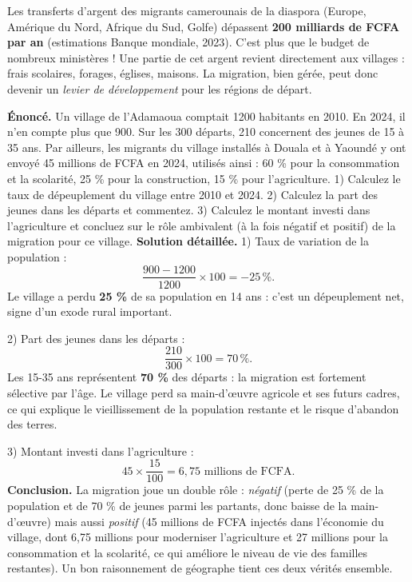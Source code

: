 \documentclass[11pt]{article}
\newcommand{\cle}[1]{{\popxbold\color{popdark}#1}}
\begin{document}
\begin{savaistu}
Les transferts d'argent des migrants camerounais de la diaspora (Europe, Amérique du Nord, Afrique du Sud, Golfe) dépassent \textbf{200 milliards de FCFA par an} (estimations Banque mondiale, 2023). C'est plus que le budget de nombreux ministères ! Une partie de cet argent revient directement aux villages : frais scolaires, forages, églises, maisons. La migration, bien gérée, peut donc devenir un \emph{levier de développement} pour les régions de départ.
\end{savaistu}

\begin{exoresolu}
\textbf{Énoncé.} Un village de l'Adamaoua comptait \num{1200} habitants en 2010. En 2024, il n'en compte plus que 900. Sur les 300 départs, 210 concernent des jeunes de 15 à 35 ans. Par ailleurs, les migrants du village installés à Douala et à Yaoundé y ont envoyé 45 millions de FCFA en 2024, utilisés ainsi : 60 \% pour la consommation et la scolarité, 25 \% pour la construction, 15 \% pour l'agriculture.
1) Calculez le taux de dépeuplement du village entre 2010 et 2024.
2) Calculez la part des jeunes dans les départs et commentez.
3) Calculez le montant investi dans l'agriculture et concluez sur le rôle ambivalent (à la fois négatif et positif) de la migration pour ce village.
\tcblower
\textbf{Solution détaillée.}
1) Taux de variation de la population :
\[ \frac{900-1200}{1200}\times 100 = -25\,\%. \]
Le village a perdu \textbf{25 \%} de sa population en 14 ans : c'est un dépeuplement net, signe d'un exode rural important.

2) Part des jeunes dans les départs :
\[ \frac{210}{300}\times 100 = 70\,\%. \]
Les 15-35 ans représentent \textbf{70 \%} des départs : la migration est fortement \cle{sélective} par l'âge. Le village perd sa main-d'œuvre agricole et ses futurs cadres, ce qui explique le vieillissement de la population restante et le risque d'abandon des terres.

3) Montant investi dans l'agriculture :
\[ 45 \times \frac{15}{100} = 6,75 \text{ millions de FCFA}. \]
\textbf{Conclusion.} La migration joue un double rôle : \emph{négatif} (perte de 25 \% de la population et de 70 \% de jeunes parmi les partants, donc baisse de la main-d'œuvre) mais aussi \emph{positif} (45 millions de FCFA injectés dans l'économie du village, dont 6,75 millions pour moderniser l'agriculture et 27 millions pour la consommation et la scolarité, ce qui améliore le niveau de vie des familles restantes). Un bon raisonnement de géographe tient ces deux vérités ensemble.
\end{exoresolu}
\end{document}
